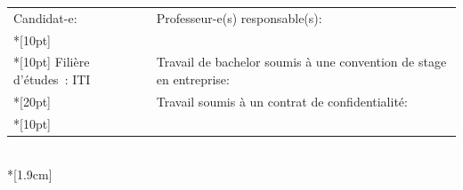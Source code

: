 \begin{spacing}{0.956}
\begin{center}
{
	\begin{tabular*}{16cm}{p{7.59cm} p{7.58cm}}
		\small Candidat-e:					&	\small Professeur-e(s) responsable(s):\\*[10pt]
		\small\textbf{\textsc{\Author}}		&	\small\textbf{\textsc{\Professor}}\\*[10pt]
		\footnotesize  Filière d’études : ITI %
		\footnotesize  {} & \footnotesize  Travail de bachelor soumis à une convention de stage en entreprise: \Convention\\*[20pt]
		\footnotesize  {} & \footnotesize  Travail soumis à un contrat de confidentialité: \Confidentiel\\*[10pt]
	\end{tabular*}\\*[1.9cm]
}


\end{center}
\end{spacing}
          


